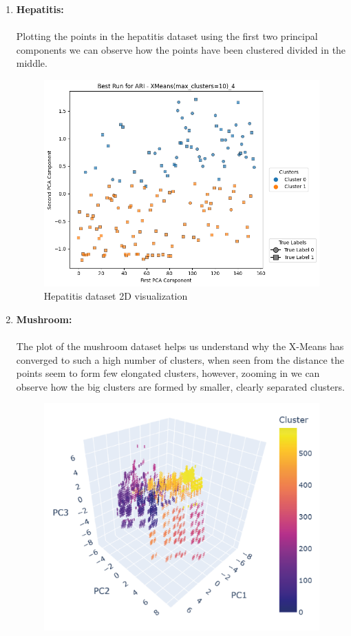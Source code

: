 \begin{enumerate}
    \item \textbf{Hepatitis:}
        \\\\Plotting the points in the hepatitis dataset using the first two principal components we can observe how the points have been clustered divided in the middle.
        \begin{figure}[H]
            \centering
            \includegraphics[width=0.7\linewidth]{figures/XMeans/hepatitis_visualization.png}
            \caption{Hepatitis dataset 2D visualization}
        \end{figure}
    \item \textbf{Mushroom:}
        \\\\The plot of the mushroom dataset helps us understand why the X-Means has converged to such a high number of clusters, when seen from the distance the points seem to form few elongated clusters, however, zooming in we can observe how the big clusters are formed by smaller, clearly separated clusters.
        \begin{figure}[H]
        \centering
        \includegraphics[width=0.7\linewidth]{figures/XMeans/mushroom_visualization.png}

\end{figure}
\end{enumerate}
